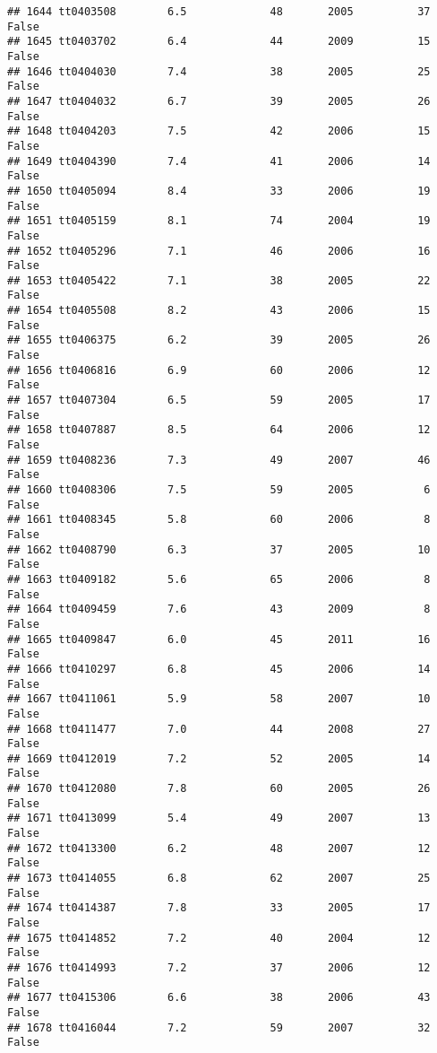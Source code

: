 \documentclass[
]{article}
\begin{document}
\begin{verbatim}
## 1644 tt0403508        6.5             48       2005          37   False
## 1645 tt0403702        6.4             44       2009          15   False
## 1646 tt0404030        7.4             38       2005          25   False
## 1647 tt0404032        6.7             39       2005          26   False
## 1648 tt0404203        7.5             42       2006          15   False
## 1649 tt0404390        7.4             41       2006          14   False
## 1650 tt0405094        8.4             33       2006          19   False
## 1651 tt0405159        8.1             74       2004          19   False
## 1652 tt0405296        7.1             46       2006          16   False
## 1653 tt0405422        7.1             38       2005          22   False
## 1654 tt0405508        8.2             43       2006          15   False
## 1655 tt0406375        6.2             39       2005          26   False
## 1656 tt0406816        6.9             60       2006          12   False
## 1657 tt0407304        6.5             59       2005          17   False
## 1658 tt0407887        8.5             64       2006          12   False
## 1659 tt0408236        7.3             49       2007          46   False
## 1660 tt0408306        7.5             59       2005           6   False
## 1661 tt0408345        5.8             60       2006           8   False
## 1662 tt0408790        6.3             37       2005          10   False
## 1663 tt0409182        5.6             65       2006           8   False
## 1664 tt0409459        7.6             43       2009           8   False
## 1665 tt0409847        6.0             45       2011          16   False
## 1666 tt0410297        6.8             45       2006          14   False
## 1667 tt0411061        5.9             58       2007          10   False
## 1668 tt0411477        7.0             44       2008          27   False
## 1669 tt0412019        7.2             52       2005          14   False
## 1670 tt0412080        7.8             60       2005          26   False
## 1671 tt0413099        5.4             49       2007          13   False
## 1672 tt0413300        6.2             48       2007          12   False
## 1673 tt0414055        6.8             62       2007          25   False
## 1674 tt0414387        7.8             33       2005          17   False
## 1675 tt0414852        7.2             40       2004          12   False
## 1676 tt0414993        7.2             37       2006          12   False
## 1677 tt0415306        6.6             38       2006          43   False
## 1678 tt0416044        7.2             59       2007          32   False

\end{verbatim}
\end{document}
